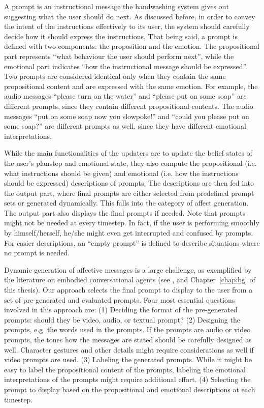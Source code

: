 A prompt is an instructional message the handwashing system gives out suggesting what the user should do next. As discussed before, in order to convey the intent of the instructions effectively to its user, the system should carefully decide how it should express the instructions. That being said, a prompt is defined with two components: the proposition and the emotion. The propositional part represents ``what behaviour the user should perform next'', while the emotional part indicates ``how the instructional message should be expressed''. Two prompts are considered identical only when they contain the same propositional content and are expressed with the same emotion. For example, the audio messages ``please turn on the water'' and ``please put on some soap'' are different prompts, since they contain different propositional contents. The audio messages ``put on some soap now you slowpoke!'' and ``could you please put on some soap?'' are different prompts as well, since they have different emotional interpretations.

While the main functionalities of the updaters are to update the belief states of the user's planstep and emotional state, they also compute the propositional (i.e. what instructions should be given) and emotional (i.e. how the instructions should be expressed) descriptions of prompts. The descriptions are then fed into the output part, where final prompts are either selected from predefined prompt sets or generated dynamically. This falls into the category of affect generation. The output part also displays the final prompts if needed. Note that prompts might not be needed at every timestep. In fact, if the user is performing smoothly by himself/herself, he/she might even get interrupted and confused by prompts. For easier descriptions, an ``empty prompt'' is defined to describe situations where no prompt is needed.

Dynamic generation of affective messages is a large challenge, as exemplified by the literature on embodied conversational agents (see \cite{cassell2000embodied, niewiadomski2013computational}, and Chapter~\ref{chap:bg} of this thesis). Our approach selects the final prompt to display to the user from a set of pre-generated and evaluated prompts. Four most essential questions involved in this approach are: (1) Deciding the format of the pre-generated prompts: should they be video, audio, or textual prompt? (2) Designing the prompts, e.g. the words used in the prompts. If the prompts are audio or video prompts, the tones how the messages are stated should be carefully designed as well. Character gestures and other details might require considerations as well if video prompts are used. (3) Labeling the generated prompts. While it might be easy to label the propositional content of the prompts, labeling the emotional interpretations of the prompts might require additional effort. (4) Selecting the prompt to display based on the propositional and emotional descriptions at each timestep. 

